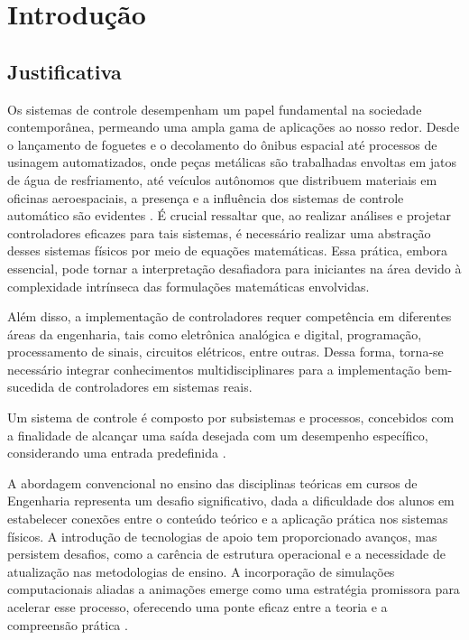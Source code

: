 
\chapter{Introdução}
\label{ch:intro}

\section{Justificativa}

Os sistemas de controle desempenham um papel fundamental na sociedade contemporânea, permeando uma ampla gama de aplicações ao nosso redor. Desde o lançamento de foguetes e o decolamento do ônibus espacial até processos de usinagem automatizados, onde peças metálicas são trabalhadas envoltas em jatos de água de resfriamento, até veículos autônomos que distribuem materiais em oficinas aeroespaciais, a presença e a influência dos sistemas de controle automático são evidentes \cite{nise2013}. É crucial ressaltar que, ao realizar análises e projetar controladores eficazes para tais sistemas, é necessário realizar uma abstração desses sistemas físicos por meio de equações matemáticas. Essa prática, embora essencial, pode tornar a interpretação desafiadora para iniciantes na área devido à complexidade intrínseca das formulações matemáticas envolvidas.

Além disso, a implementação de controladores requer competência em diferentes áreas da engenharia, tais como eletrônica analógica e digital, programação, processamento de sinais, circuitos elétricos, entre outras. Dessa forma, torna-se necessário integrar conhecimentos multidisciplinares para a implementação bem-sucedida de controladores em sistemas reais.

Um sistema de controle é composto por subsistemas e processos, concebidos com a finalidade de alcançar uma saída desejada com um desempenho específico, considerando uma entrada predefinida \cite{nise2013}.

A abordagem convencional no ensino das disciplinas teóricas em cursos de Engenharia representa um desafio significativo, dada a dificuldade dos alunos em estabelecer conexões entre o conteúdo teórico e a aplicação prática nos sistemas físicos. A introdução de tecnologias de apoio tem proporcionado avanços, mas persistem desafios, como a carência de estrutura operacional e a necessidade de atualização nas metodologias de ensino. A incorporação de simulações computacionais aliadas a animações emerge como uma estratégia promissora para acelerar esse processo, oferecendo uma ponte eficaz entre a teoria e a compreensão prática \cite{yuri_tcc}.

